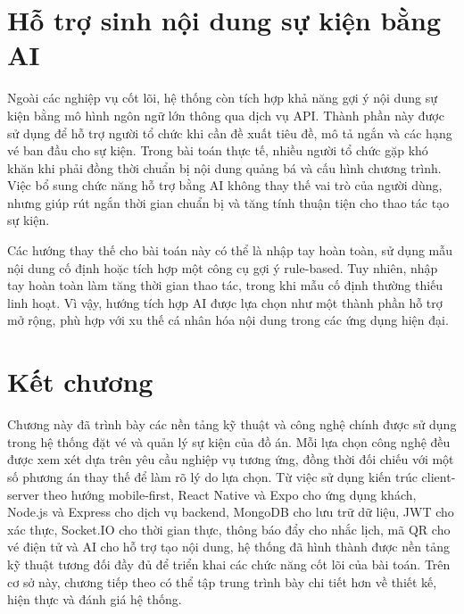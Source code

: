 \documentclass[../DoAn.tex]{subfiles}
\begin{document}
\section{Hỗ trợ sinh nội dung sự kiện bằng AI}
Ngoài các nghiệp vụ cốt lõi, hệ thống còn tích hợp khả năng gợi ý nội dung sự kiện bằng mô hình ngôn ngữ lớn thông qua dịch vụ \gls{API}. Thành phần này được sử dụng để hỗ trợ người tổ chức khi cần đề xuất tiêu đề, mô tả ngắn và các hạng vé ban đầu cho sự kiện. Trong bài toán thực tế, nhiều người tổ chức gặp khó khăn khi phải đồng thời chuẩn bị nội dung quảng bá và cấu hình chương trình. Việc bổ sung chức năng hỗ trợ bằng \gls{AI} không thay thế vai trò của người dùng, nhưng giúp rút ngắn thời gian chuẩn bị và tăng tính thuận tiện cho thao tác tạo sự kiện.

Các hướng thay thế cho bài toán này có thể là nhập tay hoàn toàn, sử dụng mẫu nội dung cố định hoặc tích hợp một công cụ gợi ý rule-based. Tuy nhiên, nhập tay hoàn toàn làm tăng thời gian thao tác, trong khi mẫu cố định thường thiếu linh hoạt. Vì vậy, hướng tích hợp AI được lựa chọn như một thành phần hỗ trợ mở rộng, phù hợp với xu thế cá nhân hóa nội dung trong các ứng dụng hiện đại.

\section{Kết chương}
Chương này đã trình bày các nền tảng kỹ thuật và công nghệ chính được sử dụng trong hệ thống đặt vé và quản lý sự kiện của đồ án. Mỗi lựa chọn công nghệ đều được xem xét dựa trên yêu cầu nghiệp vụ tương ứng, đồng thời đối chiếu với một số phương án thay thế để làm rõ lý do lựa chọn. Từ việc sử dụng kiến trúc client-server theo hướng mobile-first, React Native và Expo cho ứng dụng khách, Node.js và Express cho dịch vụ backend, MongoDB cho lưu trữ dữ liệu, JWT cho xác thực, Socket.IO cho thời gian thực, thông báo đẩy cho nhắc lịch, mã QR cho vé điện tử và AI cho hỗ trợ tạo nội dung, hệ thống đã hình thành được nền tảng kỹ thuật tương đối đầy đủ để triển khai các chức năng cốt lõi của bài toán. Trên cơ sở này, chương tiếp theo có thể tập trung trình bày chi tiết hơn về thiết kế, hiện thực và đánh giá hệ thống.
\end{document}
